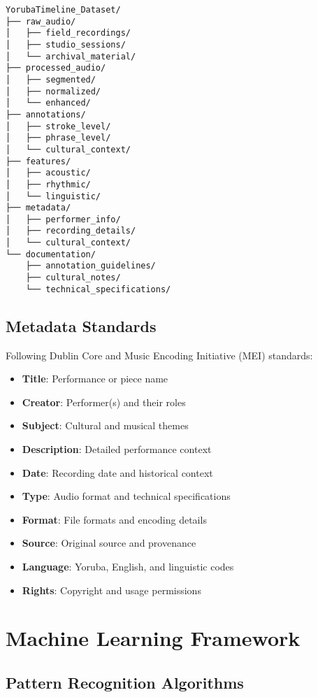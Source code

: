 \documentclass[12pt]{article}
\begin{document}
\begin{verbatim}
YorubaTimeline_Dataset/
├── raw_audio/
│   ├── field_recordings/
│   ├── studio_sessions/
│   └── archival_material/
├── processed_audio/
│   ├── segmented/
│   ├── normalized/
│   └── enhanced/
├── annotations/
│   ├── stroke_level/
│   ├── phrase_level/
│   └── cultural_context/
├── features/
│   ├── acoustic/
│   ├── rhythmic/
│   └── linguistic/
├── metadata/
│   ├── performer_info/
│   ├── recording_details/
│   └── cultural_context/
└── documentation/
    ├── annotation_guidelines/
    ├── cultural_notes/
    └── technical_specifications/
\end{verbatim}

\subsection{Metadata Standards}

Following Dublin Core and Music Encoding Initiative (MEI) standards:
\begin{itemize}
    \item \textbf{Title}: Performance or piece name
    \item \textbf{Creator}: Performer(s) and their roles
    \item \textbf{Subject}: Cultural and musical themes
    \item \textbf{Description}: Detailed performance context
    \item \textbf{Date}: Recording date and historical context
    \item \textbf{Type}: Audio format and technical specifications
    \item \textbf{Format}: File formats and encoding details
    \item \textbf{Source}: Original source and provenance
    \item \textbf{Language}: Yoruba, English, and linguistic codes
    \item \textbf{Rights}: Copyright and usage permissions
\end{itemize}

\section{Machine Learning Framework}

\subsection{Pattern Recognition Algorithms}
\end{document}
